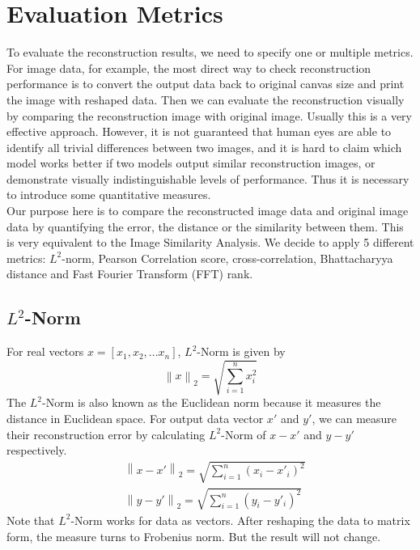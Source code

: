 \documentclass[12pt]{report} %
\newcommand{\norm}[1]{\left\lVert #1 \right\rVert}
\begin{document}
\section{Evaluation Metrics}
To evaluate the reconstruction results, we need to specify one or multiple metrics. For image data, for example, the most direct way to check reconstruction performance is to convert the output data back to original canvas size and print the image with reshaped data. Then we can evaluate the reconstruction visually by comparing the reconstruction image with original image. Usually this is a very effective approach. However, it is not guaranteed that human eyes are able to identify all trivial differences between two images, and it is hard to claim which model works better if two models output similar reconstruction images, or demonstrate visually indistinguishable levels of performance. Thus it is necessary to introduce some quantitative measures. \\
Our purpose here is to compare the reconstructed image data and original image data by quantifying the error, the distance or the similarity between them. This is very equivalent to the Image Similarity Analysis\cite{PCC,CC,ISA}. We decide to apply 5 different metrics: $L^2$-norm, Pearson Correlation score, cross-correlation, Bhattacharyya distance and Fast Fourier Transform (FFT) rank.

\subsection{$L^2$-Norm}
For real vectors $x=[x_1,x_2,...x_n]$, $L^2$-Norm\cite{NORM} is given by
\begin{equation}
\norm{x}_2=\sqrt{\sum _{i=1}^{n}x_i^2}
\end{equation}
The $L^2$-Norm is also known as the Euclidean norm because it measures the distance in Euclidean space. For output data vector $x'$ and $y'$, we can measure their reconstruction error by calculating $L^2$-Norm of $x-x'$ and $y-y'$ respectively.
\begin{equation}
\begin{split}
&\norm{x-x'}_2=\sqrt{\sum _{i=1}^{n}(x_i-x'_i)^2} \\
&\norm{y-y'}_2=\sqrt{\sum _{i=1}^{n}(y_i-y'_i)^2}
\end{split}
\end{equation}
Note that $L^2$-Norm works for data as vectors. After reshaping the data to matrix form, the measure turns to Frobenius norm\cite{NORM}. But the result will not change.
\end{document}
